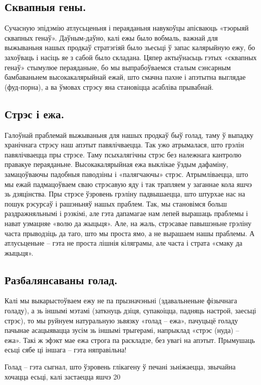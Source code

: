 \subsection{Сквапныя гены.}
Сучасную эпідэмію атлусьценьня і пераяданьня навукоўцы апісваюць «тэорыяй сквапных генаў». Даўным-даўно, калі ежы было вобмаль, важнай для выжываньня нашых продкаў стратэгіяй было зьесьці ў запас калярыйную ежу, бо захоўваць і насіць яе з сабой было складана. Цяпер актыўнасьць гэтых «сквапных генаў» стымулюе пераяданьне, бо мы выпрабоўваемся сталым сэнсарным бамбаваньнем высокакалярыйнай ежай, што смачна пахне і апэтытна выглядае (фуд-порна), а ва ўмовах стрэсу яна становіцца асабліва прывабнай.

\subsection{Стрэс і ежа.}
Галоўнай праблемай выжываньня для нашых продкаў быў голад, таму ў выпадку хранічнага стрэсу наш апэтыт павялічваецца. Так ужо атрымалася, што грэлін павялічваецца пры стрэсе. Таму псыхалягічны стрэс без належнага кантролю правакуе пераяданьне. Высокакалярыйная ежа выклікае ўздым дафаміну, замацоўваючы падобныя паводзіны і «палягчаючы» стрэс. Атрымліваецца, што мы ежай падмацоўваем сваю стрэсавую яду і так трапляем у заганнае кола яшчэ зь дзяцінства. Пры стрэсе ўзровень грэліну падвышаецца, што штурхае нас на пошук рэсурсаў і рашэньняў нашых праблем. Так, мы становімся больш раздражняльнымі і рэзкімі, але гэта дапамагае нам лепей вырашаць праблемы і нават узмацняе «волю да жыцьця». Але, на жаль, стрэсавае павышэньне грэліну часта прыводзіць да таго, што мы проста ямо, а не вырашаем нашы праблемы. А атлусьценьне – гэта не проста лішнія кіляграмы, але часта і страта «смаку да жыцьця».

\subsection{Разбалянсаваны голад.}
Калі мы выкарыстоўваем ежу не па прызначэньні (здавальненьне фізычнага голаду), а зь іншымі мэтамі (заткнуць дзіця, супакоіцца, падняць настрой, заесьці стрэс), то мы руйнуем натуральную зьвязку «голад – ежа», пачуцьцё голаду пачынае асацыявацца зусім зь іншымі трыгерамі, напрыклад «стрэс (нуда) – ежа». Такі ж эфэкт мае ежа строга па раскладзе, без увагі на апэтыт. Прымушаць есьці сябе ці іншага – гэта няправільна!

Голад – гэта сыгнал, што ўзровень глікагену ў печані зьніжаецца, звычайна хочацца есьці, калі застаецца яшчэ 20%

